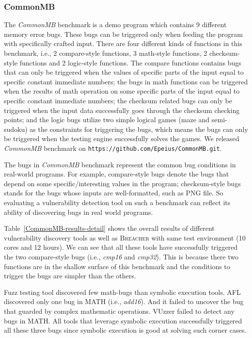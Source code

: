 \documentclass{cta-author}
\newcommand{\prototype}{\textsc{Breacher} }
\begin{document}
\subsubsection{CommonMB}
\noindent The \emph{CommonMB} benchmark is a demo program which contains 
9 different memory error bugs. These bugs can be triggered only when 
feeding the program with specifically crafted input. There are four 
different kinds of functions in this benchmark, i.e., 2 compare-style 
functions, 3 math-style functions, 2 checksum-style functions and 2 
logic-style functions. The compare functions contains bugs that can 
only be triggered when the values of specific parts of the input equal 
to specific constant immediate numbers; the bugs in math functions 
can be triggered when the results of math operation on some specific 
parts of the input equal to specific constant immediate numbers; the 
checksum related bugs can only be triggered when the input data 
successfully goes through the checksum checking points; and the logic 
bugs utilize two simple logical games (maze and semi-sudoku) as the 
constraints for triggering the bugs, which means the bugs can only be 
triggered when the testing engine successfully solves the games. We 
released \emph{CommonMB} benchmark on
\texttt{https://github.com/Epeius/CommonMB.git}.

The bugs in \emph{CommonMB} benchmark represent the common bug conditions 
in real-world programs. For example, compare-style bugs denote the bugs 
that depend on some specific/interesting values in the program; 
checksum-style bugs stands for the bugs whose inputs are well-formatted, 
such as PNG file.
So evaluating a vulnerability detection tool on such a benchmark can 
reflect its ability of discovering bugs in real world programs.

Table~\ref{CommonMB-results-detail} shows the overall results of 
different vulnerability discovery tools as well as \prototype 
with same test environment (10 cores and 12 hours).
We can see that all these tools have successfully triggered the 
two compare-style bugs (i.e., \textit{cmp16} and \textit{cmp32}). 
This is because there two functions are in the shallow surface of 
this benchmark and the conditions to trigger the bugs are simpler 
than the others.  

Fuzz testing tool discovered few math-bugs than symbolic execution 
tools. AFL discovered only one bug in MATH (i.e., \textit{add16}).
And it failed to uncover the bug that guarded by complex mathematic operations.
VUzzer failed to detect any bugs in MATH.
All tools that leverage symbolic execution successfully 
triggered all these three bugs since symbolic execution is good at 
solving such corner cases. 
\end{document}
